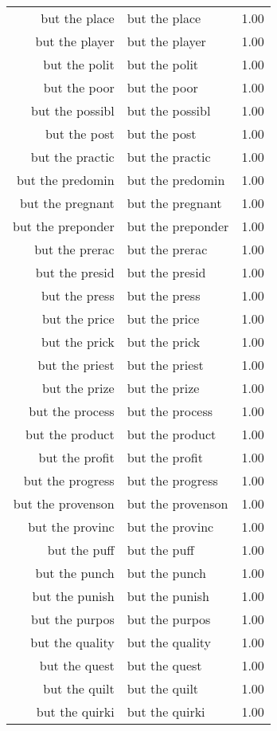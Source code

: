 \begin{table}[ht]
\begin{tabular}{rlr}
  but the place & but the place & 1.00 \\ 
  but the player & but the player & 1.00 \\ 
  but the polit & but the polit & 1.00 \\ 
  but the poor & but the poor & 1.00 \\ 
  but the possibl & but the possibl & 1.00 \\ 
  but the post & but the post & 1.00 \\ 
  but the practic & but the practic & 1.00 \\ 
  but the predomin & but the predomin & 1.00 \\ 
  but the pregnant & but the pregnant & 1.00 \\ 
  but the preponder & but the preponder & 1.00 \\ 
  but the prerac & but the prerac & 1.00 \\ 
  but the presid & but the presid & 1.00 \\ 
  but the press & but the press & 1.00 \\ 
  but the price & but the price & 1.00 \\ 
  but the prick & but the prick & 1.00 \\ 
  but the priest & but the priest & 1.00 \\ 
  but the prize & but the prize & 1.00 \\ 
  but the process & but the process & 1.00 \\ 
  but the product & but the product & 1.00 \\ 
  but the profit & but the profit & 1.00 \\ 
  but the progress & but the progress & 1.00 \\ 
  but the provenson & but the provenson & 1.00 \\ 
  but the provinc & but the provinc & 1.00 \\ 
  but the puff & but the puff & 1.00 \\ 
  but the punch & but the punch & 1.00 \\ 
  but the punish & but the punish & 1.00 \\ 
  but the purpos & but the purpos & 1.00 \\ 
  but the quality & but the quality & 1.00 \\ 
  but the quest & but the quest & 1.00 \\ 
  but the quilt & but the quilt & 1.00 \\ 
  but the quirki & but the quirki & 1.00 \\ 

\end{tabular}
\end{table}
